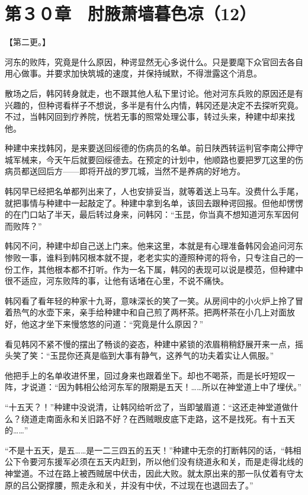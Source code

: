 \section{第３０章　肘腋萧墙暮色凉（12） }

【第二更。】

河东的败阵，究竟是什么原因，种谔显然无心多说什么。只是要麾下众官回去各自用心做事。并要求加快筑城的速度，并保持缄默，不得泄露这个消息。

散场之后，韩冈转身就走，也不跟其他人私下里讨论。他对河东兵败的原因还是有兴趣的，但种谔看样子不想说，多半是有什么内情，韩冈还是决定不去探听究竟。不过，当韩冈回到疗养院，恍若无事的照常处理公事，转过头来，种建中却来找他。

种建中来找韩冈，是来要送回绥德的伤病员的名单。前日陕西转运判官李南公押守城军械来，今天午后就要回绥德去。在预定的计划中，他顺路也要把罗兀这里的伤病员都送回后方——即将开战的罗兀城，当然不是养病的好地方。

韩冈早已经把名单都列出来了，人也安排妥当，就等着送上马车。没费什么手尾，就把事情与种建中一起敲定了。种建中拿到名单，该回去跟种谔回报。但他却愣愣的在门口站了半天，最后转过身来，问韩冈：“玉昆，你当真不想知道河东军因何而败阵？”

韩冈不问，种建中却自己送上门来。他来这里，本就是有心理准备韩冈会追问河东惨败一事，谁料到韩冈根本就不提，老老实实的遵照种谔的将令，只专注自己的一份工作，其他根本都不打听。作为一名下属，韩冈的表现可以说是模范，但种建中很不适应，河东败阵的事，让他有话堵在心里，不说不痛快。

韩冈看了看年轻的种家十九哥，意味深长的笑了一笑。从房间中的小火炉上拎了冒着热气的水壶下来，亲手给种建中和自己煎了两杯茶。把两杯茶在小几上对面放好，他这才坐下来慢悠悠的问道：“究竟是什么原因？”

看见韩冈不紧不慢的摆出了畅谈的姿态，种建中紧锁的浓眉稍稍舒展开来一点，摇头笑了笑：“玉昆你还真是临到大事有静气，这养气的功夫着实让人佩服。”

他把手上的名单收进怀里，回过身来也跟着坐下。却也不喝茶，而是长吁短叹一阵，才说道：“因为韩相公给河东军的限期是五天！……所以在神堂道上中了埋伏。”

“十五天？！”种建中没说清，让韩冈给听岔了，当即皱眉道：“这还走神堂道做什么？绕道走南面永和关旧路不好？在西贼眼皮底下走路，这不是找死。有十五天的……”

“不是十五天，是五……是一二三四五的五天！”种建中无奈的打断韩冈的话，“韩相公下令要河东援军必须在五天内赶到，所以他们没有绕道永和关，而是走得北线的神堂道。不过在路上被西贼居中伏击，因此大败。就太原出来的那一队仗着有守太原的吕公弼撑腰，照走永和关，并没有中伏，不过现在也退回去了。”

